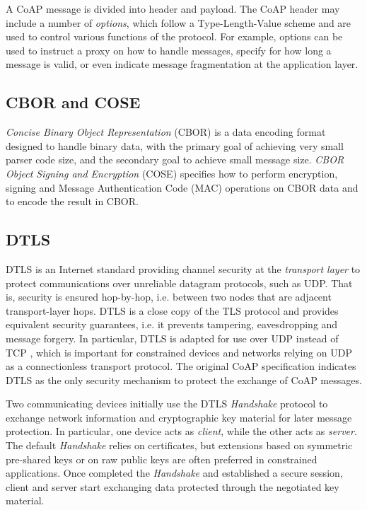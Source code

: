 {A CoAP message is divided into header and payload. The CoAP header may include a number of \emph{options}, which follow a Type-Length-Value scheme and are used to control various functions of the protocol. For example, options can be used to instruct a proxy on how to handle messages, specify for how long a message is valid, or even indicate message fragmentation at the application layer.


\subsection{CBOR and COSE}
\label{sec:cose}
\emph{Concise Binary Object Representation} (CBOR) \cite{rfc7049} is a data encoding format designed to handle binary data, with the primary goal of achieving very small parser code size, and the secondary goal to achieve small message size. \emph{CBOR Object Signing and Encryption} (COSE) \cite{rfc8152} specifies how to perform encryption, signing and Message Authentication Code (MAC) operations on CBOR data and to encode the result in CBOR.

\subsection{DTLS}
\label{ss:background-dtls}
DTLS \cite{rfc6347} is an Internet standard providing channel security at the \emph{transport layer} to protect communications over unreliable datagram protocols, such as UDP. That is, security is ensured hop-by-hop, i.e. between two nodes that are adjacent transport-layer hops. DTLS is a close copy of the TLS protocol \cite{rfc5246} and provides equivalent security guarantees, i.e. it prevents tampering, eavesdropping and message forgery. In particular, DTLS is adapted for use over UDP \cite{rfc768} instead of TCP \cite{rfc793}, which is important for constrained devices and networks relying on UDP as a connectionless transport protocol. The original CoAP specification \cite{rfc7252} indicates DTLS as the only security mechanism to protect the exchange of CoAP messages.

Two communicating devices initially use the DTLS \textit{Handshake} protocol to exchange network information and cryptographic key material for later message protection. In particular, one device acts as \textit{client}, while the other acts as \textit{server}. The default \textit{Handshake} relies on certificates, but extensions based on symmetric pre-shared keys \cite{rfc4279} or on raw public keys \cite{rfc7250} are often preferred in constrained applications. Once completed the \textit{Handshake} and established a secure session, client and server start exchanging data protected through the negotiated key material.

}
